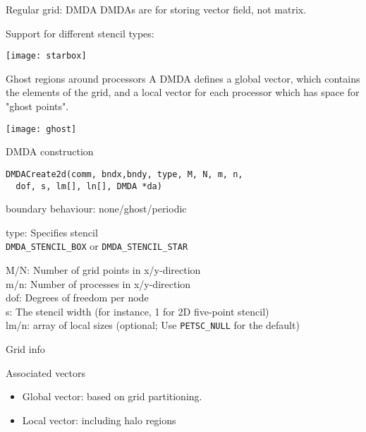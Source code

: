 

\begin{numberedframe}{Regular grid: DMDA}
DMDAs are for storing vector field, not matrix.

Support for different stencil types:

\texttt{[image: starbox]}
\end{numberedframe}

\begin{numberedframe}{Ghost regions around processors}
A DMDA defines a global vector, which contains the elements of the grid,
and a local vector for each processor which
has space for "ghost points".

\texttt{[image: ghost]}
\end{numberedframe}

\begin{numberedframe}{DMDA construction}
\begin{lstlisting}
DMDACreate2d(comm, bndx,bndy, type, M, N, m, n, 
  dof, s, lm[], ln[], DMDA *da)
\end{lstlisting}
\footnotesize
{} boundary behaviour: none/ghost/periodic

type: Specifies stencil\\
\lstinline{DMDA_STENCIL_BOX} or \lstinline{DMDA_STENCIL_STAR}

M/N: Number of grid points in x/y-direction\\
m/n: Number of processes in x/y-direction\\
dof: Degrees of freedom per node\\
s: The stencil width (for instance, 1 for 2D five-point stencil)\\
lm/n: array of local sizes (optional; 
Use \lstinline{PETSC_NULL} for the default)
\end{numberedframe}

\begin{numberedframe}{Grid info}
  \tiny
\end{numberedframe}

\begin{numberedframe}{Associated vectors}
  \begin{itemize}
  \item Global vector: based on grid partitioning.
  \item Local vector: including halo regions
  \end{itemize}
\end{numberedframe}

